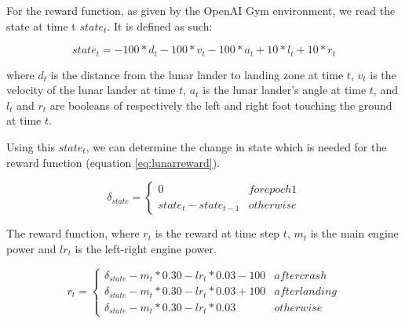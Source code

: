 For the reward function, as given by the OpenAI Gym environment, we read the state at time t $state_t$. It is defined as such:

\begin{equation} 
    state_t = -100 * d_t - 100 * v_t - 100 * a_t + 10*l_t + 10*r_t
\end{equation}

where $d_t$ is the distance from the lunar lander to landing zone at time $t$, $v_t$ is the velocity of the lunar lander at time $t$, $a_t$ is the lunar lander's angle at time $t$, and $l_t$ and $r_t$ are booleans of respectively the left and right foot touching the ground at time $t$.  

Using this $state_t$, we can determine the change in state which is needed for the reward function (equation \ref{eq:lunarreward}). 

\begin{equation}
    \delta _{state} =
    \begin{cases*}
      0  & for epoch 1 \\
      state _t - state _{t-1} & otherwise 
    \end{cases*}
\end{equation}

The reward function, where $r_t$ is the reward at time step $t$, $m_t$ is the main engine power and $lr_t$ is the left-right engine power.

\begin{equation}
\label{eq:lunarreward}
    r_t =
    \begin{cases*}
      \delta _{state} - m_t*0.30 - lr_t*0.03 -100  & after crash \\
      \delta _{state} - m_t*0.30 - lr_t*0.03 +100 & after landing \\
      \delta _{state} - m_t*0.30 - lr_t*0.03  & otherwise 
    \end{cases*}
\end{equation}
